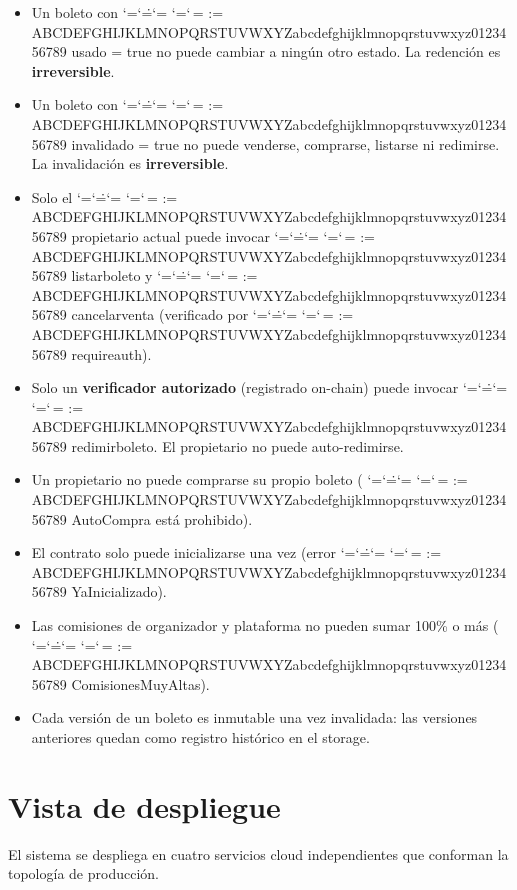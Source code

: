 \documentclass[12pt,oneside]{article}
\makeatletter
\def\ttbreak@uscore{\char95\penalty0\hskip0pt\relax}%
\def\ttbreak@actcat#1{\catcode`#1=\active}%
\def\ttbreak@chars{%
  \catcode`\/=\active \catcode`\.=\active \catcode`\:=\active
  \catcode`\-=\active \catcode`\,=\active
  \@tfor\ttbreak@c:=%
ABCDEFGHIJKLMNOPQRSTUVWXYZabcdefghijklmnopqrstuvwxyz0123456789\do{%
    \expandafter\ttbreak@actcat\ttbreak@c}%
  \let\_\ttbreak@uscore}%
\DeclareRobustCommand{\texttt}{\begingroup\ttfamily\ttbreak@chars\ttbreak@grab}
\def\ttbreak@grab#1{#1\endgroup}
\makeatother
\begin{document}
\begin{itemize}
  \item Un boleto con \texttt{usado = true} no puede cambiar a ningún otro estado. La redención es \textbf{irreversible}.
  \item Un boleto con \texttt{invalidado = true} no puede venderse, comprarse, listarse ni redimirse. La invalidación es \textbf{irreversible}.
  \item Solo el \texttt{propietario} actual puede invocar \texttt{listar\_boleto} y \texttt{cancelar\_venta} (verificado por \texttt{require\_auth}).
  \item Solo un \textbf{verificador autorizado} (registrado on-chain) puede invocar \texttt{redimir\_boleto}. El propietario no puede auto-redimirse.
  \item Un propietario no puede comprarse su propio boleto (\texttt{AutoCompra} está prohibido).
  \item El contrato solo puede inicializarse una vez (error \texttt{YaInicializado}).
  \item Las comisiones de organizador y plataforma no pueden sumar 100\% o más (\texttt{ComisionesMuyAltas}).
  \item Cada versión de un boleto es inmutable una vez invalidada: las versiones anteriores quedan como registro histórico en el storage.
\end{itemize}

\FloatBarrier
\clearpage
\section{Vista de despliegue}
\label{sec:vista-despliegue}

El sistema se despliega en cuatro servicios cloud independientes que conforman la topología de producción.
\end{document}
